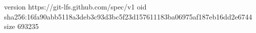 version https://git-lfs.github.com/spec/v1
oid sha256:16fa90abb5118a3deb3c93d3bc5f23d157611183ba06975af187eb16dd2e6744
size 693235
